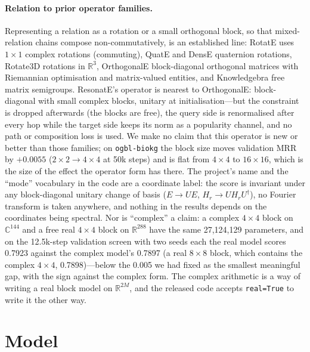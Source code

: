 \documentclass[11pt,a4paper]{article}
\newcommand{\C}{\mathbb{C}}
\newcommand{\R}{\mathbb{R}}
\begin{document}
\paragraph{Relation to prior operator families.}
Representing a relation as a rotation or a small orthogonal block, so
that mixed-relation chains compose non-commutatively, is an established
line: RotatE \citep{sun2019rotate} uses $1\times1$ complex rotations
(commuting), QuatE \citep{zhang2019quate} and DensE \citep{lu2022dense}
quaternion rotations, Rotate3D \citep{gao2020rotate3d} rotations in
$\R^3$, OrthogonalE \citep{zhu2024orthogonale} block-diagonal orthogonal
matrices with Riemannian optimisation and matrix-valued entities, and
Knowledgebra \citep{yang2022knowledgebra} free matrix semigroups.
ResonatE's operator is nearest to OrthogonalE: block-diagonal with small
complex blocks, unitary at initialisation---but the constraint is
dropped afterwards (the blocks are free), the query side is renormalised
after every hop while the target side keeps its norm as a popularity
channel, and no path or composition loss is used. We make no claim that
this operator is new or better than those families; on
\texttt{ogbl-biokg} the block size moves validation MRR by $+0.0055$
($2\times2\to4\times4$ at 50k steps) and is flat from $4\times4$ to
$16\times16$, which is the size of the effect the operator form has
there. The project's name and the ``mode'' vocabulary in the code are a
coordinate label: the score is invariant under any block-diagonal
unitary change of basis ($E\to UE$, $H_r\to UH_rU^\dagger$), no Fourier
transform is taken anywhere, and nothing in the results depends on the
coordinates being spectral. Nor is ``complex'' a claim: a complex
$4\times4$ block on $\C^{144}$ and a free real $4\times4$ block on
$\R^{288}$ have the same 27{,}124{,}129 parameters, and on the
12.5k-step validation screen with two seeds each the real model scores
0.7923 against the complex model's 0.7897 (a real $8\times8$ block, which
contains the complex $4\times4$, 0.7898)---below the 0.005 we had fixed as
the smallest meaningful gap, with the sign against the complex form. The
complex arithmetic is a way of writing a real block model on $\R^{2M}$,
and the released code accepts \texttt{real=True} to write it the other
way.

\section{Model}
\label{sec:model}
\end{document}
